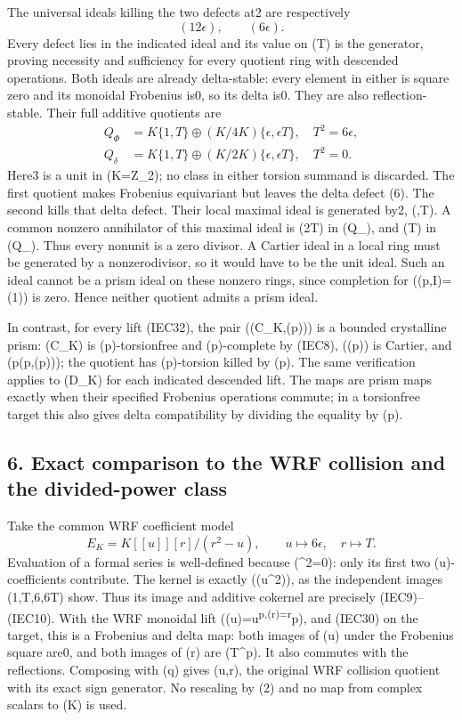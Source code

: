 \documentclass[
]{article}
\begin{document}
The universal ideals killing the two defects at2 are respectively \[
(12\epsilon),\qquad(6\epsilon).
\tag{IEC35}
\] Every defect lies in the indicated ideal and its value on (T) is the
generator, proving necessity and sufficiency for every quotient ring
with descended operations. Both ideals are already delta-stable: every
element in either is square zero and its monoidal Frobenius is0, so its
delta is0. They are also reflection-stable. Their full additive
quotients are \[
\begin{aligned}
Q_\Phi&=K\{1,T\}\oplus(K/4K)\{\epsilon,\epsilon T\},\quad T^2=6\epsilon,\\
Q_\delta&=K\{1,T\}\oplus(K/2K)\{\epsilon,\epsilon T\},\quad T^2=0.
\end{aligned}
\tag{IEC36}
\] Here3 is a unit in (K=\mathbb Z\_2); no class in either torsion
summand is discarded. The first quotient makes Frobenius equivariant but
leaves the delta defect (6\epsilon{}). The second kills that delta
defect. Their local maximal ideal is generated by2, (\epsilon,T). A
common nonzero annihilator of this maximal ideal is (2\epsilon T) in
(Q\_\Phi), and (\epsilon T) in (Q\_\delta). Thus every nonunit is a zero
divisor. A Cartier ideal in a local ring must be generated by a
nonzerodivisor, so it would have to be the unit ideal. Such an ideal
cannot be a prism ideal on these nonzero rings, since completion for
((p,I)=(1)) is zero. Hence neither quotient admits a prism ideal.

In contrast, for every lift (IEC32), the pair ((C\_K,(p))) is a bounded
crystalline prism: (C\_K) is (p)-torsionfree and (p)-complete by (IEC8),
((p)) is Cartier, and (p\in(p,\Phi(p))); the quotient has (p)-torsion
killed by (p). The same verification applies to (D\_K) for each
indicated descended lift. The maps are prism maps exactly when their
specified Frobenius operations commute; in a torsionfree target this
also gives delta compatibility by dividing the equality by (p).

\subsection{6. Exact comparison to the WRF collision and the
divided-power
class}\label{exact-comparison-to-the-wrf-collision-and-the-divided-power-class}

Take the common WRF coefficient model \[
E_K=K[[u]][r]/(r^2-u),\qquad
u\longmapsto6\epsilon,\quad r\longmapsto T.
\tag{IEC37}
\] Evaluation of a formal series is well-defined because
(\epsilon\^{}2=0): only its first two (u)-coefficients contribute. The
kernel is exactly ((u\^{}2)), as the independent images
(1,T,6\epsilon,6\epsilon T) show. Thus its image and additive cokernel
are precisely (IEC9)--(IEC10). With the WRF monoidal lift
(\Phi(u)=u\textsuperscript{p,\Phi(r)=r}p), and (IEC30) on the target,
this is a Frobenius and delta map: both images of (u) under the
Frobenius square are0, and both images of (r) are (T\^{}p). It also
commutes with the reflections. Composing with (q) gives
(u,r\mapsto\eta), the original WRF collision quotient with its
exact sign generator. No rescaling by (2) and no map from complex
scalars to (K) is used.
\end{document}
